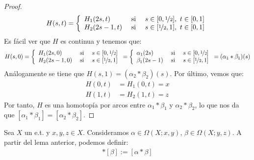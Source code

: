 \begin{lema}
\begin{proof}
\begin{gather*}
            H(s,t) = \left\{
                \begin{array}{l c c}
                    H_1(2s, t) & \text{ si } & s \in [0,\nicefrac{1}{2}],\ t\in [0,1]\\
                    H_2(2s-1, t) & \text{ si } & s \in [\nicefrac{1}{2},1],\ t\in [0,1]\\
                \end{array}
            \right.
        \end{gather*}
        Es fácil ver que $H$ es continua y tenemos que: 
        \begin{gather*}
            H(s,0) = \left\{
                \begin{array}{l c c}
                    H_1(2s, 0) & \text{ si } & s \in [0,\nicefrac{1}{2}]\\
                    H_2(2s-1, 0) & \text{ si } & s \in [\nicefrac{1}{2},1]\\
                \end{array}
            \right. = 
            \left\{
                \begin{array}{l c c}
                    \alpha_1(2s) & \text{ si } & s \in [0,\nicefrac{1}{2}]\\
                    \beta_1(2s-1) & \text{ si } & s \in [\nicefrac{1}{2},1]\\
                \end{array}
            \right. = (\alpha_1 \ast \beta_1)(s)
        \end{gather*}
        Análogamente se tiene que $H(s,1)=(\alpha_2\ast\beta_2)(s)$. Por último, vemos que:
        \begin{align*}
            H(0,t) &= H_1(0,t) = x\\
            H(1,t) &= H_2(1,t) = z
        \end{align*}
        Por tanto, $H$ es una homotopía por arcos entre $\alpha_1\ast\beta_1$ y $\alpha_2\ast\beta_2$, lo que nos da que $[\alpha_1\ast\beta_1] = [\alpha_2\ast\beta_2]$.
    \end{proof}
\end{lema}

\begin{definicion}
    Sea $X$ un e.t. y $x,y,z\in X$. Consideramos $\alpha\in \Omega(X;x,y)$, $\beta \in \Omega(X;y,z)$. A partir del lema anterior, podemos definir:
    \begin{gather*}
        [\alpha] \ast [\beta] := [\alpha \ast \beta]
    \end{gather*}
\end{definicion}


